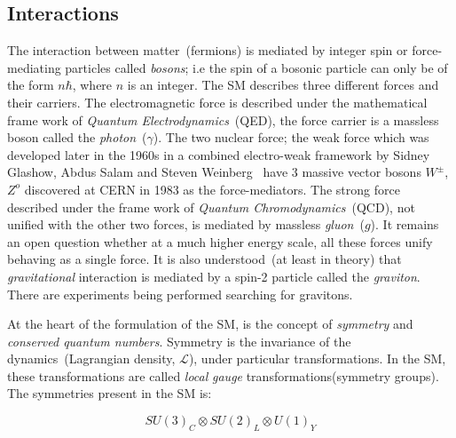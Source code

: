 \subsection*{Interactions}
The interaction between matter~(fermions) is mediated by integer spin or force-mediating particles called \textit{bosons}; i.e the spin of a bosonic particle can only be of the form $n\hbar$, where $n$ is an integer. The SM describes three different forces and their carriers. The electromagnetic force is described under the mathematical frame work of \textit{Quantum Electrodynamics}~(QED), the force carrier is a massless boson called the \textit{photon}~($\gamma$). The two nuclear force; the weak force which was developed later in the 1960s in a combined electro-weak framework by Sidney Glashow, Abdus Salam and Steven Weinberg~\cite{SM} have 3 massive vector bosons $W^{\pm}$, $Z^{o}$ discovered at CERN in 1983 as the force-mediators. The strong force described under the frame work of \textit{Quantum Chromodynamics}~(QCD), not unified with the other two forces, is mediated by massless \textit{gluon}~($g$).  It remains an open question whether at a much higher energy scale, all these forces unify behaving as a single force. It is also understood~(at least in theory) that \textit{gravitational} interaction is mediated by a spin-2 particle called the \textit{graviton}. There are experiments being performed searching  for gravitons.



 At the heart of the formulation of the SM, is the concept of \textit{symmetry} and \textit{conserved quantum numbers}. Symmetry is the invariance of the dynamics~(Lagrangian density, $\mathcal{L}$), under particular transformations. In the SM, these transformations are called \textit{local} \textit{gauge} transformations(symmetry groups). %
The symmetries present in the SM is:

\begin{equation}
SU(3)_{C} \otimes SU(2)_{L} \otimes U(1)_{Y}
\end{equation}

